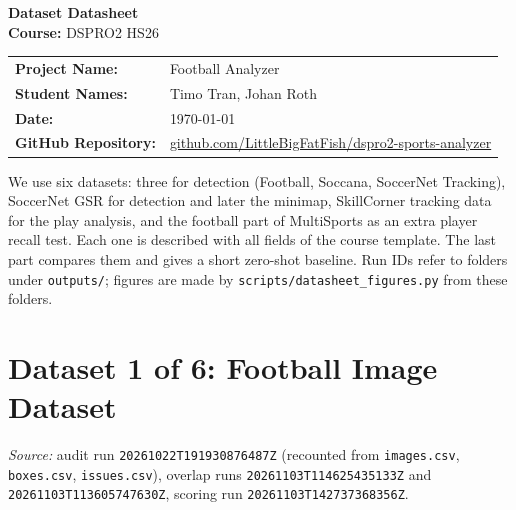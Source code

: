 \documentclass[11pt, a4paper]{article}
\newif\ifreportednoted
\newcommand{\resetreported}{\global\reportednotedfalse}
\begin{document}
\begin{center}
    {\huge \bfseries \color{primaryBlue} Dataset Datasheet} \\[0.2cm]
    {\large \textbf{Course:} DSPRO2 HS26} \\[0.1cm]
\end{center}

\vspace{0.4cm}

\begin{studentbox}
    \begin{tabularx}{\textwidth}{l X}
        \textbf{Project Name:} & Football Analyzer \\
        \textbf{Student Names:} & Timo Tran, Johan Roth \\
        \textbf{Date:} & \today \\
        \textbf{GitHub Repository:} & \url{github.com/LittleBigFatFish/dspro2-sports-analyzer} \\
    \end{tabularx}
\end{studentbox}

\vspace{0.3cm}

\noindent We use six datasets: three for detection (Football, Soccana, SoccerNet Tracking), SoccerNet GSR for detection and later the minimap, SkillCorner tracking data for the play analysis, and the football part of MultiSports as an extra player recall test. Each one is described with all fields of the course template. The last part compares them and gives a short zero-shot baseline. Run IDs refer to folders under \texttt{outputs/}; figures are made by \texttt{scripts/datasheet\_figures.py} from these folders.

\section{Dataset 1 of 6: Football Image Dataset}
\resetreported

\begin{sloppypar}\noindent\textit{Source:} audit run \texttt{20261022T191930876487Z} (recounted from \texttt{images.csv}, \texttt{boxes.csv}, \texttt{issues.csv}), overlap runs \texttt{20261103T114625435133Z} and \texttt{20261103T113605747630Z}, scoring run \texttt{20261103T142737368356Z}.\end{sloppypar}
\end{document}
